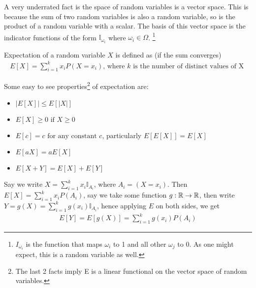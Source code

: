 A very underrated fact is the space of random variables is a vector space. This is because the sum of two random variables is also a random variable, so is the product of a random variable with a scalar. The basis of this vector space is the indicator functions of the form $\mathbb{I}_{\omega_i}$ where $\omega_i \in \Omega$. \footnote{$I_{\omega_i}$ is the function that maps $\omega_i$ to 1 and all other $\omega_j$ to 0. As one might expect, this is a random variable as well.}
\begin{definition}
    Expectation of a random variable $X$ is defined as (if the sum converges)
    \begin{align}
        E[X]=\sum_{i=1}^{k}{x_i P(X=x_i)} \text{, where $k$ is the number of distinct values of X }
    \end{align}
\end{definition}
Some easy to see properties\footnote{The last 2 facts imply E is a linear functional on the vector space of random variables.} 
of expectation are:
\begin{itemize}
    \item $|E[X]| \leq E[|X|]$
    \item $E[X]\geq 0 \text{ if } X\geq0$
    \item $E[c]=c \text{ for any constant } c$, particularly $E[E[X]]=E[X]$
    \item $E[aX]=aE[X]$
    \item $E[X+Y]=E[X]+E[Y]$
\end{itemize}
Say we write $X=\sum_{i=1}^{k}{x_i \mathbb{I}_{A_i}}$, where $A_i=(X=x_i)$. Then $E[X]=\sum_{i=1}^{k}{x_i P(A_i)}$,
say we take some function $g:\mathbb{R} \to \mathbb{R}$, then write $Y=g(X)=\sum_{i=1}^{k}{g(x_i) \mathbb{I}_{A_i}}$, hence applying $E$ on both sides, we get
\begin{align}
    E[Y]=E[g(X)]=\sum_{i=1}^{k}{g(x_i) P(A_i)}
\end{align}
